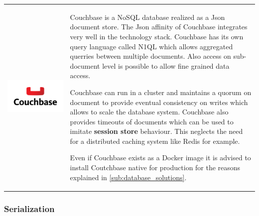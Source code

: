 \begin{table}[h!]
  \centering
  \begin{tabular}{ c m{9cm} }
    \begin{minipage}{.3\textwidth}
      \includegraphics[width=\linewidth]{images/dependencies/couchbase}
    \end{minipage}&
    Couchbase is a NoSQL database realized as a Json document store. The Json
    affinity of Couchbase integrates very well in the technology stack.
    Couchbase has its own query language called N1QL which allows aggregated
    querries between multiple documents. Also access on sub-document level is
    possible to allow fine grained data access.
    
    Couchbase can run in a cluster and maintains a quorum on document to provide
    eventual consistency on writes which allows to scale the database system.
    Couchbase also provides timeouts of documents which can be used to imitate
    \textbf{session store} behaviour. This neglects the need for a distributed
    caching system like Redis for example. 
    
    Even if Couchbase exists as a Docker image it is advised to install
    Coutchbase native for production for the reasons explained in
    \autoref{sub:database_solutions}.
    
  \end{tabular}
\end{table}
\FloatBarrier
\newpage

\subsubsection{Serialization}

